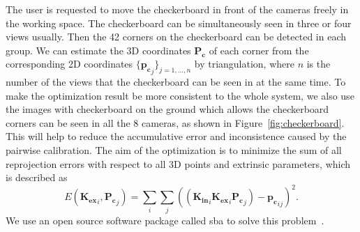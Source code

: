 %
The user is requested to move the checkerboard in front of the cameras freely in the working space. The checkerboard can be simultaneously seen in three or four views usually.
%
Then the 42 corners on the checkerboard can be detected in each group.
%
We can estimate the 3D coordinates $\mathbf{P_{c}}$ of each corner from the corresponding 2D coordinates $\{\mathbf{p_{c}}_{j}\}_{j=1,...,n}$ by triangulation, where $n$ is the number of the views that the checkerboard can be seen in at the same time.
To make the optimization result be more consistent to the whole system, we also use the images with checkerboard on the ground which allows the checkerboard corners can be seen in all the 8 cameras,  as shown in Figure~\ref{fig:checkerboard}. This will help to reduce the accumulative error and inconsistence caused by the pairwise calibration.
The aim of the optimization is to minimize the sum of all reprojection errors with respect to all 3D points and extrinsic parameters, which is described as
\begin{equation}
E(\mathbf{K_{ex}}_{i},\mathbf{P_{c}}_{j})=\sum_{i}\sum_{j}((\mathbf{K_{in}}_{i}\mathbf{K_{ex}}_{i}\mathbf{P_{c}}_{j})-\mathbf{p_{c}}_{ij})^{2}.
\end{equation}
We use an open source software package called sba to solve this problem~\cite{lour09}.


